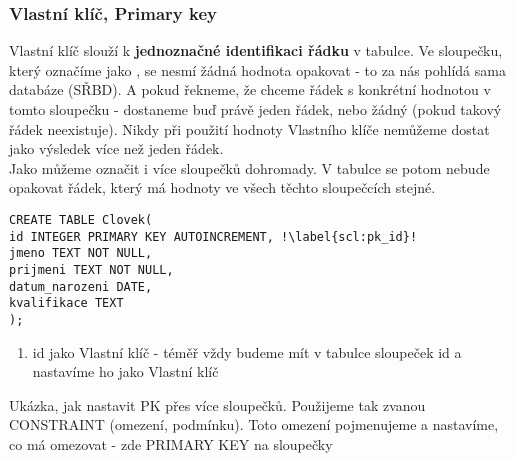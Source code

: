\subsubsection{Vlastní klíč, Primary key}
Vlastní klíč slouží k \textbf{jednoznačné identifikaci řádku} v tabulce. Ve sloupečku, který označíme jako , se nesmí žádná hodnota opakovat - to za nás pohlídá sama databáze (SŘBD). A pokud řekneme, že chceme řádek s konkrétní hodnotou v tomto sloupečku - dostaneme buď právě jeden řádek, nebo žádný (pokud takový řádek neexistuje). Nikdy při použití hodnoty Vlastního klíče nemůžeme dostat jako výsledek více než jeden řádek.\\
Jako  můžeme označit i více sloupečků dohromady. V tabulce se potom nebude opakovat řádek, který má hodnoty ve všech těchto sloupečcích stejné.\\
\begin{minipage}[t]{.45\textwidth}
\begin{code}
\begin{verbatim}
CREATE TABLE Clovek( 
id INTEGER PRIMARY KEY AUTOINCREMENT, !\label{scl:pk_id}!
jmeno TEXT NOT NULL,
prijmeni TEXT NOT NULL,
datum_narozeni DATE,
kvalifikace TEXT
);
\end{verbatim}
\label{code:primary_key_id}
\end{code}
\end{minipage}
\begin{minipage}[t]{.45\textwidth}
\begin{enumerate}
\item[ř. \ref{scl:pk_id}:]	id jako Vlastní klíč - téměř vždy budeme mít v tabulce sloupeček id a nastavíme ho jako Vlastní klíč
\end{enumerate} 
\end{minipage}

Ukázka, jak nastavit PK přes více sloupečků. Použijeme tak zvanou CONSTRAINT (omezení, podmínku). Toto omezení pojmenujeme a nastavíme, co má omezovat - zde PRIMARY KEY na sloupečky 

